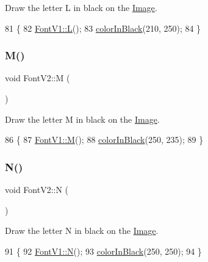 Draw the letter L in black on the \mbox{\hyperlink{class_image}{Image}}. 


\begin{DoxyCode}
81                \{
82     \mbox{\hyperlink{class_font_v1_a17ba426bfb42af35ea882ab3beeba734}{FontV1::L}}();
83     \mbox{\hyperlink{class_font_v2_a04f2501961bc286ce70fbb6a840b0e8a}{colorInBlack}}(210, 250);
84 \}
\end{DoxyCode}
\mbox{\label{class_font_v2_a65ab055c8555447a542ed5c26ef925ee}} 
\subsubsection{\texorpdfstring{M()}{M()}}
{\footnotesize\ttfamily void Font\+V2\+::M (\begin{DoxyParamCaption}{ }\end{DoxyParamCaption})}



Draw the letter M in black on the \mbox{\hyperlink{class_image}{Image}}. 


\begin{DoxyCode}
86                \{
87     \mbox{\hyperlink{class_font_v1_a69afdf545ed6bccbb31efaef5d6d4219}{FontV1::M}}();
88     \mbox{\hyperlink{class_font_v2_a04f2501961bc286ce70fbb6a840b0e8a}{colorInBlack}}(250, 235);
89 \}
\end{DoxyCode}
\mbox{\label{class_font_v2_ab0f1cbe6375f24c45f6d9bd518165353}} 
\subsubsection{\texorpdfstring{N()}{N()}}
{\footnotesize\ttfamily void Font\+V2\+::N (\begin{DoxyParamCaption}{ }\end{DoxyParamCaption})}



Draw the letter N in black on the \mbox{\hyperlink{class_image}{Image}}. 


\begin{DoxyCode}
91                \{
92     \mbox{\hyperlink{class_font_v1_a725c93ea00d851ca5b43c0d594f1d6d0}{FontV1::N}}();
93     \mbox{\hyperlink{class_font_v2_a04f2501961bc286ce70fbb6a840b0e8a}{colorInBlack}}(250, 250);
94 \}
\end{DoxyCode}
\mbox{\label{class_font_v2_afb1d85a50e3982f0f1e77d5e1ca7f53c}} 
